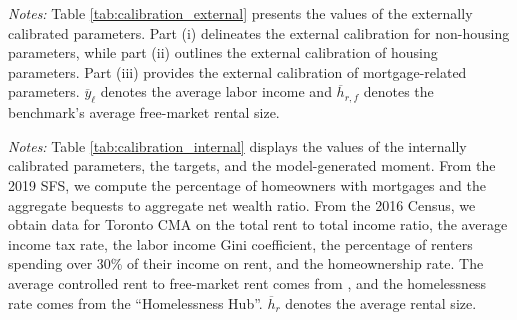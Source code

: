 \documentclass[parskip=full]{article}
\newenvironment{fignote2}[1]
{
\par
\medskip
\begin{minipage}{#1}
\footnotesize
}
{
\end{minipage}
}
\begin{document}



\vspace{1cm}

\begin{table}[H]
    \centering
    \caption{Externally assigned parameter values}
    \vspace{-0.5cm}
    \label{tab:calibration_external}
    
    \vspace{-0.45cm}
    \begin{fignote2}{1.02\textwidth}
    \textit{Notes:} Table \ref{tab:calibration_external} presents the values of the externally calibrated parameters. Part (i) delineates the external calibration for non-housing parameters, while part (ii) outlines the external calibration of housing parameters. Part (iii) provides the external calibration of mortgage-related parameters. $\overline{y}_{\ell}$ denotes the average labor income and $\overline{h}_{r,f}$ denotes the benchmark's average free-market rental size.
    \end{fignote2}
\end{table}

\begin{table}[H]
    \centering
    \caption{Internally calibrated parameter values}
    \vspace{-0.5cm}
    \label{tab:calibration_internal}
    
    \vspace{-0.45cm}
    \begin{fignote2}{1.03\textwidth}
    \textit{Notes:} Table \ref{tab:calibration_internal} displays the values of the internally calibrated parameters, the targets, and the model-generated moment. From the 2019 SFS, we compute the percentage of homeowners with mortgages and the aggregate bequests to aggregate net wealth ratio. From the 2016 Census, we obtain data for Toronto CMA on the total rent to total income ratio, the average income tax rate, the labor income Gini coefficient, the percentage of renters spending over 30\% of their income on rent, and the homeownership rate. The average controlled rent to free-market rent comes from \citet{zhang-gou}, and the homelessness rate comes from the ``Homelessness Hub''. $\overline{h}_{r}$ denotes the average rental size.
    \end{fignote2}
\end{table}
\end{document}
